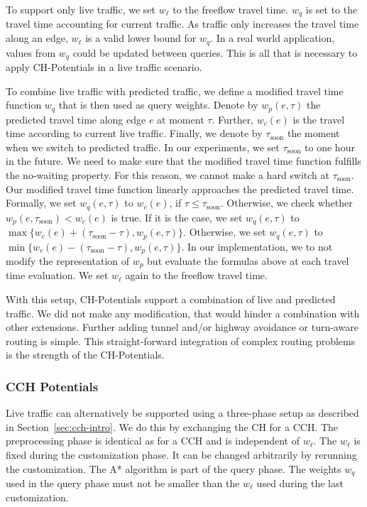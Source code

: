 \documentclass[manuscript,review]{acmart}
\begin{document}
To support only live traffic, we set $w_\ell$ to the freeflow travel time.
$w_q$ is set to the travel time accounting for current traffic.
As traffic only increases the travel time along an edge, $w_\ell$ is a valid lower bound for $w_q$.
In a real world application, values from $w_q$ could be updated between queries.
This is all that is necessary to apply CH-Potentials in a live traffic scenario.

To combine live traffic with predicted traffic, we define a modified travel time function $w_q$ that is then used as query weights.
Denote by $w_p(e,\tau)$ the predicted travel time along edge $e$ at moment $\tau$.
Further, $w_c(e)$ is the travel time according to current live traffic.
Finally, we denote by $\tau_{\mathrm{soon}}$ the moment when we switch to predicted traffic.
In our experiments, we set $\tau_{\mathrm{soon}}$ to one hour in the future.
We need to make sure that the modified travel time function fulfills the no-waiting property.
For this reason, we cannot make a hard switch at $\tau_{\mathrm{soon}}$.
Our modified travel time function linearly approaches the predicted travel time. %
%
Formally, we set $w_q(e,\tau)$ to $w_c(e)$, if $\tau \leq \tau_{\mathrm{soon}}$.
Otherwise, we check whether $w_p(e,\tau_{\mathrm{soon}}) < w_c(e)$ is true.
If it is the case, we set $w_q(e,\tau)$ to $\max\{w_c(e)+(\tau_{\mathrm{soon}}-\tau), w_p(e,\tau)\}$.
Otherwise, we set $w_q(e,\tau)$ to $\min\{w_c(e)-(\tau_{\mathrm{soon}}-\tau), w_p(e,\tau)\}$.
In our implementation, we to not modify the representation of $w_p$ but evaluate the formulas above at each travel time evaluation.
We set $w_\ell$ again to the freeflow travel time.

With this setup, CH-Potentials support a combination of live and predicted traffic.
We did not make any modification, that would hinder a combination with other extensions.
Further adding tunnel and/or highway avoidance or turn-aware routing is simple.
This straight-forward integration of complex routing problems is the strength of the CH-Potentials.

\subsubsection{CCH Potentials}

Live traffic can alternatively be supported using a three-phase setup as described in Section~\ref{sec:cch-intro}.
We do this by exchanging the CH for a CCH.
The preprocessing phase is identical as for a CCH and is independent of $w_\ell$.
The $w_\ell$ is fixed during the customization phase.
It can be changed arbitrarily by rerunning the customization.
The A* algorithm is part of the query phase.
The weights $w_q$ used in the query phase must not be smaller than the $w_\ell$ used during the last customization.
\end{document}
